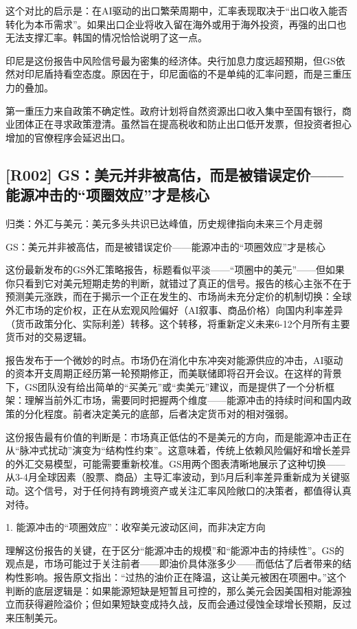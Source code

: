 \documentclass[11pt]{ctexart}
\begin{document}
这个对比的启示是：在AI驱动的出口繁荣周期中，汇率表现取决于“出口收入能否转化为本币需求”。如果出口企业将收入留在海外或用于海外投资，再强的出口也无法支撑汇率。韩国的情况恰恰说明了这一点。

印尼是这份报告中风险信号最为密集的经济体。央行加息力度远超预期，但GS依然对印尼盾持看空态度。原因在于，印尼面临的不是单纯的汇率问题，而是三重压力的叠加。

第一重压力来自政策不确定性。政府计划将自然资源出口收入集中至国有银行，商业团体正在寻求政策澄清。虽然旨在提高税收和防止出口低开发票，但投资者担心增加的官僚程序会延迟出口。

\subsection{[R002] GS：美元并非被高估，而是被错误定价——能源冲击的“项圈效应”才是核心}
{\small\color{refgray}归类：外汇与美元：美元多头共识已达峰值，历史规律指向未来三个月走弱}

GS：美元并非被高估，而是被错误定价——能源冲击的“项圈效应”才是核心

这份最新发布的GS外汇策略报告，标题看似平淡——“项圈中的美元”——但如果你只看到它对美元短期走势的判断，就错过了真正的信号。报告的核心主张不在于预测美元涨跌，而在于揭示一个正在发生的、市场尚未充分定价的机制切换：全球外汇市场的定价权，正在从宏观风险偏好（AI叙事、商品价格）向国内利率差异（货币政策分化、实际利差）转移。这个转移，将重新定义未来6-12个月所有主要货币对的交易逻辑。

报告发布于一个微妙的时点。市场仍在消化中东冲突对能源供应的冲击，AI驱动的资本开支周期正经历第一轮预期修正，而美联储即将召开会议。在这样的背景下，GS团队没有给出简单的“买美元”或“卖美元”建议，而是提供了一个分析框架：理解当前外汇市场，需要同时把握两个维度——能源冲击的持续时间和国内政策的分化程度。前者决定美元的底部，后者决定货币对的相对强弱。

这份报告最有价值的判断是：市场真正低估的不是美元的方向，而是能源冲击正在从“脉冲式扰动”演变为“结构性约束”。这意味着，传统上依赖风险偏好和增长差异的外汇交易模型，可能需要重新校准。GS用两个图表清晰地展示了这种切换——从3-4月全球因素（股票、商品）主导汇率波动，到5月后利率差异重新成为关键驱动。这个信号，对于任何持有跨境资产或关注汇率风险敞口的决策者，都值得认真对待。

1. 能源冲击的“项圈效应”：收窄美元波动区间，而非决定方向

理解这份报告的关键，在于区分“能源冲击的规模”和“能源冲击的持续性”。GS的观点是，市场可能过于关注前者——即油价具体涨多少——而低估了后者带来的结构性影响。报告原文指出：“过热的油价正在降温，这让美元被困在项圈中。”这个判断的底层逻辑是：如果能源短缺是短暂且可控的，那么美元会因美国相对能源独立而获得避险溢价；但如果短缺变成持久战，反而会通过侵蚀全球增长预期，反过来压制美元。
\end{document}

